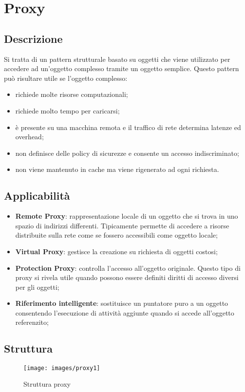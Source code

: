 \section{Proxy}
\subsection{Descrizione}
Si tratta di un pattern strutturale basato su oggetti che viene utilizzato per accedere ad un’oggetto complesso tramite un oggetto semplice.
Questo pattern può risultare utile se l’oggetto complesso:
\begin{itemize}
\item richiede molte risorse computazionali;
\item richiede molto tempo per caricarsi;
\item è presente su una macchina remota e il traffico di rete determina latenze ed overhead;
\item non definisce delle policy di sicurezze e consente un accesso indiscriminato;
\item non viene mantenuto in cache ma viene rigenerato ad ogni richiesta.
\end{itemize}

\subsection{Applicabilità}
\begin{itemize}
	\item \textbf{Remote Proxy}: rappresentazione locale di un oggetto che si trova in uno spazio di indirizzi differenti. Tipicamente permette di accedere a risorse distribuite sulla rete come se fossero accessibili come oggetto locale;
	\item \textbf{Virtual Proxy}: gestisce la creazione su richiesta di oggetti costosi;
	\item \textbf{Protection Proxy}: controlla l'accesso all'oggetto originale. Questo tipo di proxy si rivela utile quando possono essere definiti diritti di accesso diversi per gli oggetti;
	\item \textbf{Riferimento intelligente}: sostituisce un puntatore puro a un oggetto consentendo l'esecuzione di attività aggiunte quando si accede all'oggetto referenzito;
\end{itemize}

\subsection{Struttura}
\begin{figure}[H]
\centering
\texttt{[image: images/proxy1]}
\caption{Struttura proxy\label{fig:UC3}}
\end{figure}


